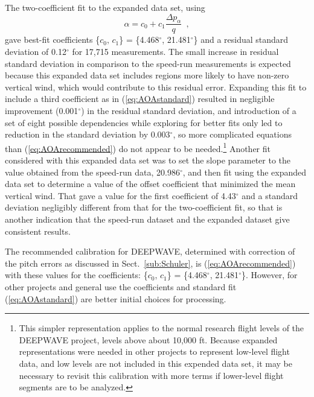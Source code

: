\documentclass[12pt,twoside,english]{article}\usepackage[]{graphicx}\usepackage[]{color}
\let\OrgIndex\index
\renewcommand*{\index}[1]{\OrgIndex{#1}}
\begin{document}
{{The two-coefficient fit to the expanded data set, using\\ 
\begin{equation}
\alpha=c_{0}+c_{1}\frac{\Delta p_{\alpha}}{q}\,\,\,,\label{eq:AOArecommended} 
\end{equation}
gave best-fit coefficients 
\{$c_{0},\, c_{1}$\} = \{4.468$^{\circ}$, 21.481$^{\circ}$\}  
and a residual standard deviation of 0.12$^{\circ}$  
for 17,715 measurements. The small increase in residual standard deviation in comparison to the speed-run measurements is expected because this expanded data set includes regions more likely to have non-zero vertical wind, which would contribute to this residual error. Expanding this fit to include a third coefficient as in (\ref{eq:AOAstandard}) resulted in negligible improvement (0.001$^{\circ}$) in the residual standard deviation, and introduction of a set of eight possible dependencies while exploring for better fits only led to reduction in the standard deviation by 0.003$^{\circ}$, so more complicated equations than (\ref{eq:AOArecommended}) do not appear to be needed.\footnote{This simpler representation applies to the normal research flight levels of the DEEPWAVE project, levels above about 10,000 ft. Because expanded representations were needed in other projects to represent low-level flight data, and low levels are not included in this expended data set, it may be necessary to revisit this calibration with more terms if lower-level flight segments are to be analyzed.} Another fit considered with this expanded data set was to set the slope parameter to the value obtained from the speed-run data, 20.986$^{\circ}$, and then fit using the expanded data set to determine a value of the offset coefficient that minimized the mean vertical wind. That gave a value for the first coefficient of 4.43$^{\circ}$ and a standard deviation negligibly different from that for the two-coefficient fit, so that is another indication that the speed-run dataset and the expanded dataset give consistent results.  

The recommended calibration for DEEPWAVE, determined with correction of the pitch errors as discussed in Sect.~\ref{sub:Schuler}, is (\ref{eq:AOArecommended}) with these values for the coefficients: \{$c_{0},\, c_{1}$\} = \{4.468$^{\circ}$, 21.481$^{\circ}$\}.\label{page:aoarec} 
However, for other projects and general use the coefficients and standard fit
(\ref{eq:AOAstandard}) are better initial choices for processing.

}}
\end{document}
